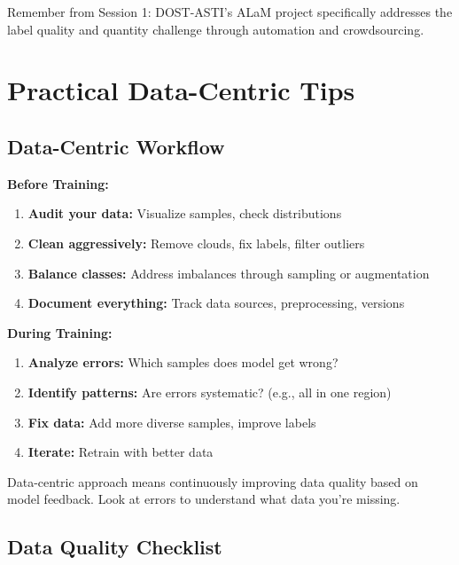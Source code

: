 \documentclass[
  letterpaper,
  DIV=11,
  numbers=noendperiod]{scrartcl}
\providecommand{\tightlist}{%
  \setlength{\itemsep}{0pt}\setlength{\parskip}{0pt}}
\begin{document}
Remember from Session 1: DOST-ASTI's ALaM project specifically addresses
the label quality and quantity challenge through automation and
crowdsourcing.

\section{Practical Data-Centric Tips}\label{practical-data-centric-tips}

\subsection{Data-Centric Workflow}\label{data-centric-workflow}

\textbf{Before Training:}

\begin{enumerate}
\def\labelenumi{\arabic{enumi}.}
\tightlist
\item
  \textbf{Audit your data:} Visualize samples, check distributions
\item
  \textbf{Clean aggressively:} Remove clouds, fix labels, filter
  outliers
\item
  \textbf{Balance classes:} Address imbalances through sampling or
  augmentation
\item
  \textbf{Document everything:} Track data sources, preprocessing,
  versions
\end{enumerate}

\textbf{During Training:}

\begin{enumerate}
\def\labelenumi{\arabic{enumi}.}
\setcounter{enumi}{4}
\tightlist
\item
  \textbf{Analyze errors:} Which samples does model get wrong?
\item
  \textbf{Identify patterns:} Are errors systematic? (e.g., all in one
  region)
\item
  \textbf{Fix data:} Add more diverse samples, improve labels
\item
  \textbf{Iterate:} Retrain with better data
\end{enumerate}

Data-centric approach means continuously improving data quality based on
model feedback. Look at errors to understand what data you're missing.

\subsection{Data Quality Checklist}\label{data-quality-checklist}
\end{document}
